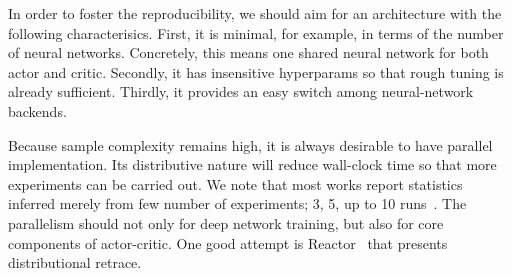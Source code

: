 In order to foster the reproducibility, we should aim for an architecture with the following characterisics.
First, it is minimal, for example, in terms of the number of neural networks.
Concretely, this means one shared neural network for both actor and critic.
Secondly, it has insensitive hyperparams so that rough tuning is already sufficient.
Thirdly, it provides an easy switch among neural-network backends.

Because sample complexity remains high, it is always desirable to have parallel implementation.
Its distributive nature will reduce wall-clock time so that more experiments can be carried out.
We note that most works report statistics inferred merely from few number of experiments; 3, 5, up to 10 runs~\cite{henderson2017reinforcement}.
The parallelism should not only for deep network training, but also for core components of actor-critic.
One good attempt is Reactor~\cite{Gruslys2018} that presents distributional retrace.
